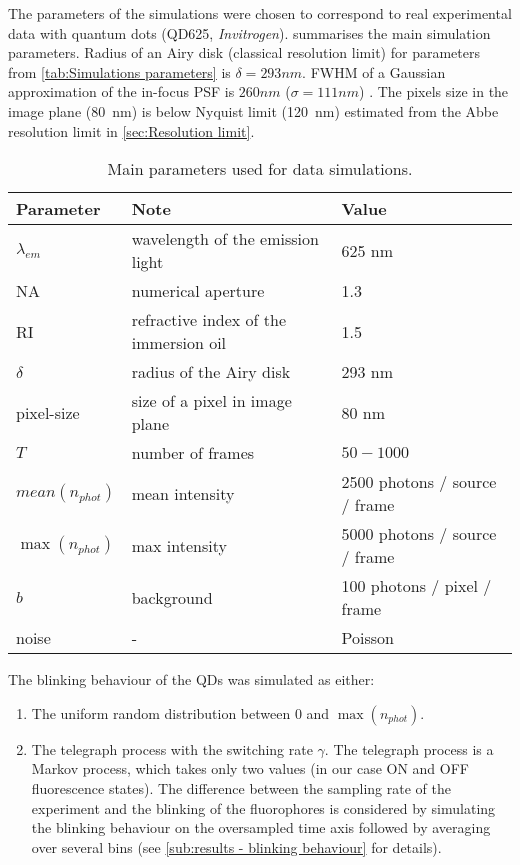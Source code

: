 The parameters of the simulations were chosen to correspond to real experimental data with quantum dots (QD625, \emph{Invitrogen}).   summarises the main simulation parameters. Radius of an Airy disk (classical resolution limit) for parameters from \autoref{tab:Simulations parameters} is $\delta=293 \unit{nm}$. FWHM of a Gaussian approximation of the in-focus PSF is $260\unit{nm}$ ($\sigma = 111\unit{nm}$) \cite{Zhang2007}. The pixels size in the image plane (80~nm) is below Nyquist limit (120~nm) estimated from the Abbe resolution limit in \autoref{sec:Resolution limit}.
%
\begin{table}[!h]	
	\centering
	\begin{tabular}{|l|l|l|}		
		\hline \small
		\bf Parameter 		& \bf Note  			& \bf Value\tabularnewline
		\hline %
		$\lambda_{em}$ 	& wavelength of the emission light 	& 625 nm\tabularnewline
		NA 				& numerical aperture 	& 1.3\tabularnewline
		RI 				& refractive index of the immersion oil	& 1.5\tabularnewline
		$\delta$ 			& radius of the Airy disk 	& 293 nm\tabularnewline		
		pixel-size 			& size of a pixel in image plane	& 80 nm\tabularnewline
		$T$ 				& number of frames  		& $50-1000$\tabularnewline
		$\unit{mean}(n_{phot})$ & mean intensity  		& 2500 photons / source / frame\tabularnewline
		$\max(n_{phot})$ 	& max intensity	 		& 5000 photons / source / frame\tabularnewline
		$b$ 				& background 			& 100 photons / pixel / frame\tabularnewline
		noise			& -					& Poisson\tabularnewline
		\hline
	\end{tabular}
	\caption{Main parameters used for data simulations.}
	\label{tab:Simulations parameters}
\end{table}

The blinking behaviour of the QDs was simulated as either:
%
\begin{enumerate}
	\item
	The uniform random distribution between $0$ and $\max(n_{phot})$.
	\item
	The telegraph process with the switching rate $\gamma$. The telegraph process is a Markov process, which takes only two values (in our case ON and OFF fluorescence states). The difference between the sampling rate of the experiment and the blinking of the fluorophores is considered by simulating the blinking behaviour on the oversampled time axis followed by averaging over several bins (see \autoref{sub:results - blinking behaviour} for details). 
\end{enumerate}
 
